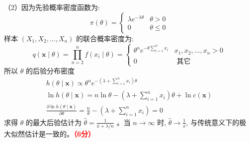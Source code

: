 \documentclass[12pt,a4paper,openany,twoside]{ctexbook}
\begin{document}
\begin{Solution}
	（2）因为先验概率密度函数为:
	$$
	\pi(\theta)=\left\{\begin{array}{cc}
		\lambda e^{-\lambda \theta} & \theta>0 \\
		0 & \theta \leq 0
	\end{array}\right.
	$$
	样本 $\left(X_{1}, X_{2}, \ldots, X_{n}\right)$ 的联合概率密度为:
	$$
	q(\mathbf{x} \mid \theta)=\prod_{n=2}^{n} f\left(x_{i} \mid \theta\right)=\left\{\begin{array}{cc}
		\theta^{n} e^{-\theta \sum_{i=1}^{n} x_{i}} & x_{1}, x_{2}, \ldots, x_{n}>0 \\
		0 & \text { 其它 }
	\end{array}\right.
	$$
	所以 $\theta$ 的后验分布密度
	$$
	\begin{gathered}
		h(\theta \mid \mathbf{x}) \propto \theta^{n} e^{-\left(\lambda+\sum_{i=1}^{n} x_{i}\right) \theta} \\
		\ln h(\theta \mid \mathbf{x})=n \ln \theta-\left(\lambda+\sum_{i=1}^{n} x_{i}\right) \theta+\ln c(\mathbf{x}) \\
		\frac{\partial \ln h(\theta \mid \mathbf{x})}{\partial \theta}=\frac{n}{\theta}-\left(\lambda+\sum_{i=1}^{n} x_{i}\right)=0
	\end{gathered}
	$$
	求得 $\theta$ 的最大后验估计为 $\hat{\theta}=\frac{1}{\bar{x}+\lambda / n}$ 。当 $n \rightarrow \infty$ 时, $\hat{\theta} \rightarrow \frac{1}{\bar{x}}$, 与传统意义下的极 大似然估计是一致的。\hfill \textcolor{red}{\textbf{（6分）}}
\end{Solution}
\end{document}
